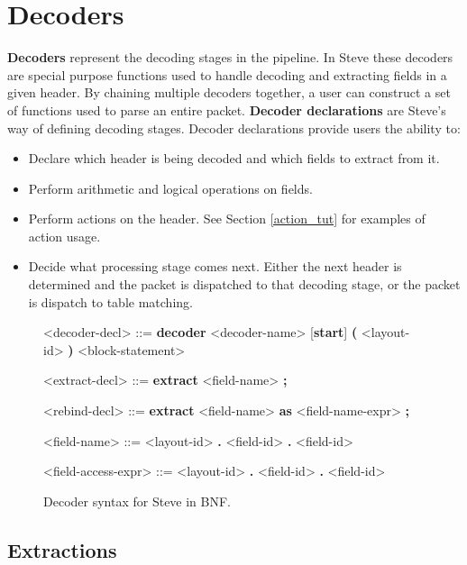 \section{Decoders} \label{decoder_tut}

\textbf{Decoders} represent the decoding stages in the pipeline. In Steve these decoders  are special purpose functions used to handle decoding and extracting fields in a given header. By chaining multiple decoders together, a user can construct a set of functions used to parse an entire packet. \textbf{Decoder declarations} are Steve's way of defining decoding stages. Decoder declarations provide users the ability to:

\begin{itemize}
\item Declare which header is being decoded and which fields to extract from it.
\item Perform arithmetic and logical operations on fields.
\item Perform actions on the header. See Section \ref{action_tut} for examples of action usage.
\item Decide what processing stage comes next. Either the next header is determined and the packet is dispatched to that decoding stage, or the packet is dispatch to table matching.
\end{itemize}

\begin{figure}[ht]
\begin{mdframed}
\begin{grammar}

<decoder-decl> ::=
\textbf{decoder} <decoder-name> [\textbf{start}] 
\textbf{(} <layout-id> \textbf{)}
<block-statement>

<extract-decl> ::=
\textbf{extract} <field-name> \textbf{;}

<rebind-decl> ::=
\textbf{extract} <field-name> \textbf{as} <field-name-expr> \textbf{;}

<field-name> ::=
<layout-id> \textbf{.} <field-id>
 \textbf{.} <field-id>

<field-access-expr> ::=
<layout-id> \textbf{.} <field-id>
 \textbf{.} <field-id>

\end{grammar}
\end{mdframed}
\caption{Decoder syntax for Steve in BNF.}
\label{fg:decoder_syntax}
\end{figure}

\subsection{Extractions} \label{decoder_extract_tut}

